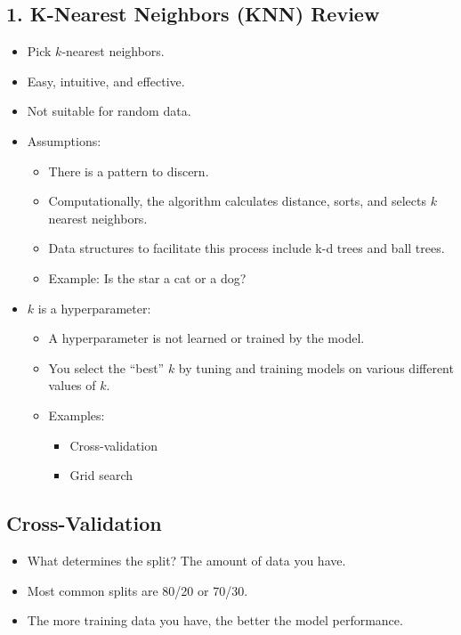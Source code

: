 \subsection*{1. K-Nearest Neighbors (KNN) Review}
\begin{itemize}
    \item Pick $k$-nearest neighbors.
    \item Easy, intuitive, and effective.
    \item Not suitable for random data.
    \item Assumptions:
    \begin{itemize}
        \item There is a pattern to discern.
        \item Computationally, the algorithm calculates distance, sorts, and selects $k$ nearest neighbors.
        \item Data structures to facilitate this process include k-d trees and ball trees.
        \item Example: Is the star a cat or a dog?
    \end{itemize}
    \item $k$ is a hyperparameter:
    \begin{itemize}
        \item A hyperparameter is not learned or trained by the model.
        \item You select the “best” $k$ by tuning and training models on various different values of $k$.
        \item Examples:
        \begin{itemize}
            \item Cross-validation
            \item Grid search
        \end{itemize}
    \end{itemize}
\end{itemize}

\subsection*{Cross-Validation}
\begin{itemize}
    \item What determines the split? The amount of data you have.
    \item Most common splits are 80/20 or 70/30.
    \item The more training data you have, the better the model performance.
\end{itemize}

